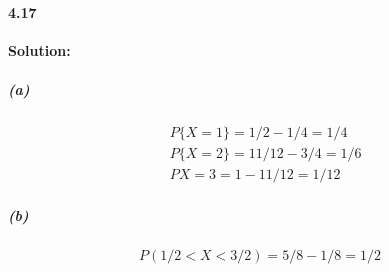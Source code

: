 \documentclass[11pt]{article}
\begin{document}
	\paragraph{4.17}\textbf{Solution:}
		\subparagraph{(a)}
			\begin{align}
				&P\{X = 1\} = 1/2 - 1/4 = 1/4\nonumber\\
				&P\{X = 2\} = 11/12 - 3/4 = 1/6\nonumber\\
				&P{X = 3} = 1 - 11/12 = 1/12\nonumber
			\end{align}
		\subparagraph{(b)}
			\[P(1/2 < X < 3/2) = 5/8 - 1/8 = 1/2\]
\end{document}
